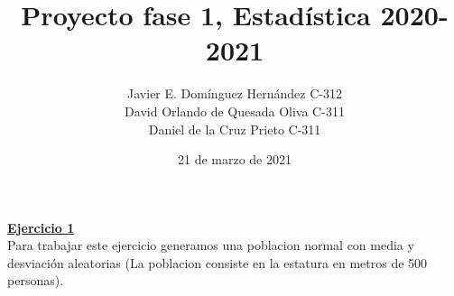 \documentclass[a4paper,12pt]{article}
\begin{document}
\title{\huge\bf Proyecto fase 1, Estad\'istica 2020-2021}
\author{Javier E. Dom\'inguez Hern\'andez C-312\\
        David Orlando de Quesada Oliva C-311\\
        Daniel de la Cruz Prieto C-311\\        
        }
\date{21 de marzo de 2021}
\maketitle


\textbf{\large\underline{Ejercicio 1}}\\

\noindent Para trabajar este ejercicio generamos una poblacion normal con media y desviaci\'on aleatorias
(La poblacion consiste en la estatura en metros de 500 personas).\\
\end{document}
